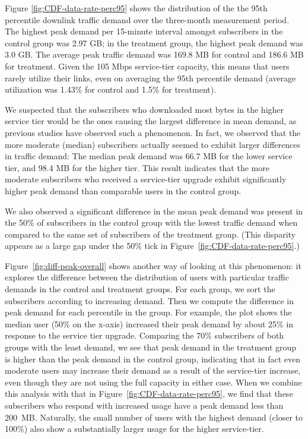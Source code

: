 Figure \ref{fig:CDF-data-rate-perc95} shows the distribution of the the
95th percentile downlink traffic demand over the three-month measurement
period. The highest peak demand per 15-minute interval amongst
subscribers in the control group was 2.97 GB; in the treatment group,
the highest peak demand was 3.0 GB.
The average peak traffic demand was 169.8 MB for control and
186.6 MB for treatment. Given the 105 Mbps service-tier capacity,
this means that users rarely utilize their links,
even on averaging the 95th percentile demand (average utilization was 
1.43\% for control and 1.5\% for treatment).

We suspected that the subscribers who downloaded most bytes in the
higher service tier would be the ones causing the largest difference in
mean demand, as previous studies have observed such a phenomenon. In
fact, we observed that the more moderate (median) subscribers actually seemed
to exhibit larger differences in traffic demand: The median peak demand
was 66.7 MB for the lower service tier, and 98.4 MB for the higher
tier.  This result indicates that the more moderate subscribers who
received a service-tier upgrade exhibit significantly higher peak
demand than comparable users in the control group.

We also observed a significant difference in the mean peak
demand was present in the 50\% of subscribers in the control group
with the lowest traffic demand when compared to the same set of
subscribers of the treatment group. (This disparity appears as a large
gap under the 50\% tick in Figure~\ref{fig:CDF-data-rate-perc95}.)


Figure~\ref{fig:diff-peak-overall} shows another way of looking at this
phenomenon: it explores the difference between the distribution of users
with particular traffic demands in the control and treatment groups.
For each group, we sort the subscribers according to
increasing demand.  Then we compute the difference in peak demand for
each percentile in the group.  For example, the plot shows the median
user (50\% on the x-axis) increased their peak demand by about 25\% in
response to the service tier upgrade.  Comparing the 70\% subscribers of
both groups with the least demand, we see that peak demand in the
treatment group is higher than the peak demand in the control group,
indicating that in fact even moderate users may increase their demand as a
result of the service-tier increase, even though they are not using the
full capacity in either case.
When we combine this analysis with that in
Figure~\ref{fig:CDF-data-rate-perc95}, we find that these subscribers
who respond with increased usage have a peak demand less than 200~MB.
Naturally, the small number of users with the highest demand (closer to
100\%) also show a substantially larger usage for the higher service-tier.


